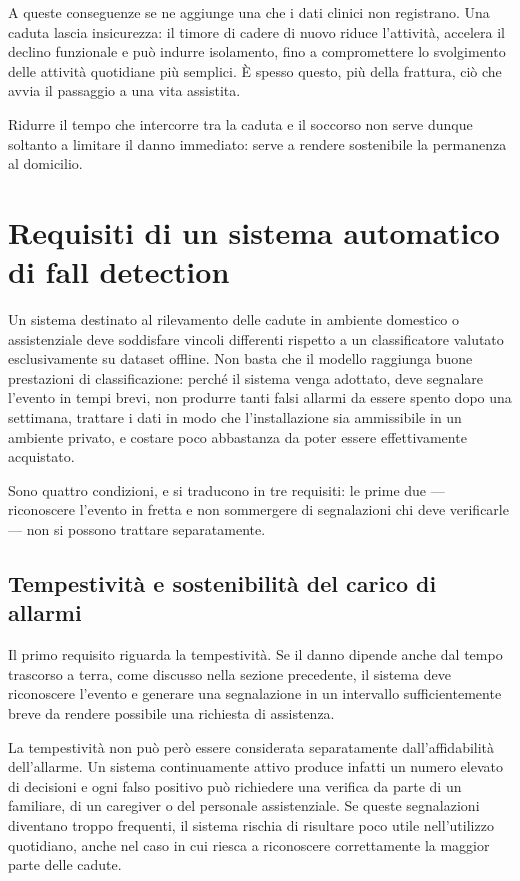 A queste conseguenze se ne aggiunge una che i dati clinici non registrano.
Una caduta lascia insicurezza: il timore di cadere di nuovo riduce
l'attività, accelera il declino funzionale e può indurre isolamento, fino a
compromettere lo svolgimento delle attività quotidiane più semplici. È spesso
questo, più della frattura, ciò che avvia il passaggio a una vita assistita.

Ridurre il tempo che intercorre tra la caduta e il soccorso non serve dunque
soltanto a limitare il danno immediato: serve a rendere sostenibile la
permanenza al domicilio.

\section{Requisiti di un sistema automatico di fall detection}

Un sistema destinato al rilevamento delle cadute in ambiente domestico o
assistenziale deve soddisfare vincoli differenti rispetto a un classificatore
valutato esclusivamente su dataset offline. Non basta che il modello raggiunga
buone prestazioni di classificazione: perché il sistema venga adottato, deve
segnalare l'evento in tempi brevi, non produrre tanti falsi allarmi da essere
spento dopo una settimana, trattare i dati in modo che l'installazione sia
ammissibile in un ambiente privato, e costare poco abbastanza da poter essere
effettivamente acquistato.

Sono quattro condizioni, e si traducono in tre requisiti: le prime due ---
riconoscere l'evento in fretta e non sommergere di segnalazioni chi deve
verificarle --- non si possono trattare separatamente.

\subsection{Tempestività e sostenibilità del carico di allarmi}

Il primo requisito riguarda la tempestività. Se il danno dipende anche dal
tempo trascorso a terra, come discusso nella sezione precedente, il sistema
deve riconoscere l'evento e generare una segnalazione in un intervallo
sufficientemente breve da rendere possibile una richiesta di assistenza.

La tempestività non può però essere considerata separatamente
dall'affidabilità dell'allarme. Un sistema continuamente attivo produce
infatti un numero elevato di decisioni e ogni falso positivo può richiedere
una verifica da parte di un familiare, di un caregiver o del personale
assistenziale. Se queste segnalazioni diventano troppo frequenti, il sistema
rischia di risultare poco utile nell'utilizzo quotidiano, anche nel caso in
cui riesca a riconoscere correttamente la maggior parte delle cadute.


